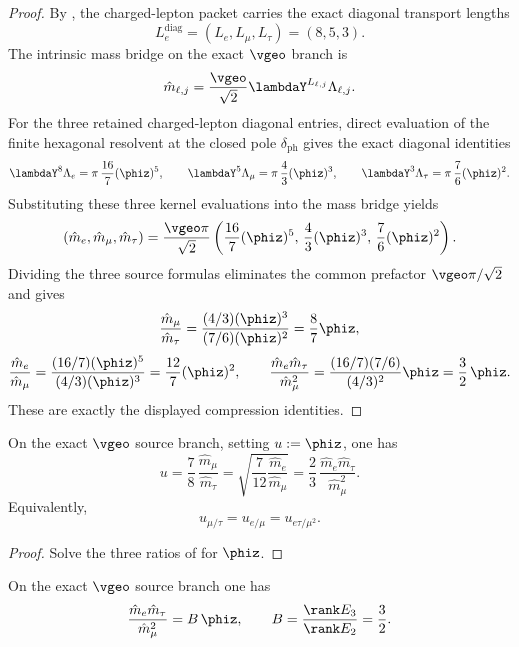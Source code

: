 \begin{proof}
By , the charged-lepton packet carries the exact diagonal
transport lengths
\[
L_e^{\mathrm{diag}}=(L_e,L_\mu,L_\tau)=(8,5,3).
\]
The intrinsic mass bridge on the exact $\vgeo$ branch is
\[
\hat m_{\ell,j}
=
\frac{\vgeo}{\sqrt2}\lambdaY^{L_{\ell,j}}\Lambda_{\ell,j}.
\]
For the three retained charged-lepton diagonal entries, direct evaluation of the finite hexagonal
resolvent  at the closed pole $\delta_{\mathrm{ph}}$ gives the
exact diagonal identities
\[
\lambdaY^{8}\Lambda_e
=
\pi\,\frac{16}{7}(\phiz)^5,
\qquad
\lambdaY^{5}\Lambda_\mu
=
\pi\,\frac{4}{3}(\phiz)^3,
\qquad
\lambdaY^{3}\Lambda_\tau
=
\pi\,\frac{7}{6}(\phiz)^2.
\]
Substituting these three kernel evaluations into the mass bridge yields
\[
(\hat m_e,\hat m_\mu,\hat m_\tau)
=
\frac{\vgeo\pi}{\sqrt2}
\left(
\frac{16}{7}(\phiz)^5,\,
\frac{4}{3}(\phiz)^3,\,
\frac{7}{6}(\phiz)^2
\right).
\]
Dividing the three source formulas eliminates the common prefactor $\vgeo\pi/\sqrt2$ and gives
\[
\frac{\hat m_\mu}{\hat m_\tau}
=
\frac{(4/3)(\phiz)^3}{(7/6)(\phiz)^2}
=
\frac{8}{7}\phiz,
\]
\[
\frac{\hat m_e}{\hat m_\mu}
=
\frac{(16/7)(\phiz)^5}{(4/3)(\phiz)^3}
=
\frac{12}{7}(\phiz)^2,
\qquad
\frac{\hat m_e \hat m_\tau}{\hat m_\mu^2}
=
\frac{(16/7)(7/6)}{(4/3)^2}\phiz
=
\frac32\,\phiz.
\]
These are exactly the displayed compression identities.
\end{proof}

\begin{corollary}
\label{cor:charged-lepton-seed-decoder}
On the exact $\vgeo$ source branch, setting $u:=\phiz$, one has
\[
u
=
\frac78\,\frac{\hat m_\mu}{\hat m_\tau}
=
\sqrt{\frac7{12}\frac{\hat m_e}{\hat m_\mu}}
=
\frac23\,\frac{\hat m_e\hat m_\tau}{\hat m_\mu^2}.
\]
Equivalently,
\[
u_{\mu/\tau}=u_{e/\mu}=u_{e\tau/\mu^2}.
\]
\end{corollary}

\begin{proof}
Solve the three ratios of  for $\phiz$.
\end{proof}

\begin{corollary}
\label{cor:carrier-asymmetry-leptons}
On the exact $\vgeo$ source branch one has
\[
\frac{\hat m_e \hat m_\tau}{\hat m_\mu^2}=B\,\phiz,
\qquad
B=\frac{\rank E_3}{\rank E_2}=\frac32.
\]
\end{corollary}

